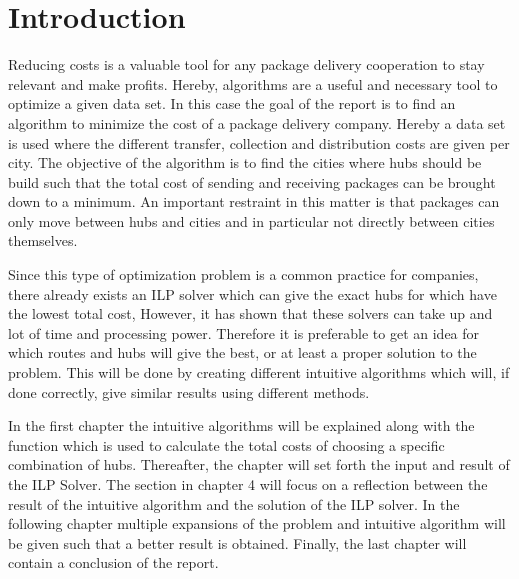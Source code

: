 \documentclass{article}
\begin{document}




\newpage
\tableofcontents



\newpage
\section{Introduction}



Reducing costs is a valuable tool for any package delivery cooperation to stay relevant and make profits. Hereby, algorithms are a useful and necessary tool to optimize a given data set. In this case the goal of the report is to find an algorithm to minimize the cost of a package delivery company. Hereby a data set is used where the different transfer, collection and distribution costs are given per city. The objective of the algorithm is to find the cities where hubs should be build such that the total cost of sending and receiving packages can be brought down to a minimum. An important restraint in this matter is that packages can only move between hubs and cities and in particular not directly between cities themselves. %

Since this type of optimization problem is a common practice for companies, there already exists an ILP solver which can give the exact hubs for which have the lowest total cost, However, it has shown that these solvers can take up and lot of time and processing power. Therefore it is preferable to get an idea for which routes and hubs will give the best, or at least a proper solution to the problem. This will be done by creating different intuitive algorithms which will, if done correctly, give similar results using different methods.

In the first chapter the intuitive algorithms will be explained along with the function which is used to calculate the total costs of choosing a specific combination of hubs. Thereafter, the chapter will set forth the input and result of the ILP Solver. The section in chapter 4 will focus on a reflection between the result of the intuitive algorithm and the solution of the ILP solver. In the following chapter multiple expansions of the problem and intuitive algorithm will be given such that a better result is obtained. Finally, the last chapter will contain a conclusion of the report.
\end{document}
